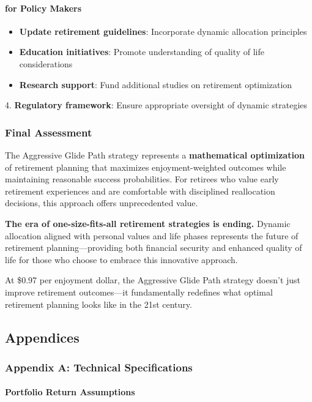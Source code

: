 \documentclass[11pt,letterpaper]{article}
\begin{document}
\paragraph{for Policy Makers}
\begin{itemize}
\item \textbf{Update retirement guidelines}: Incorporate dynamic allocation principles
\item \textbf{Education initiatives}: Promote understanding of quality of life considerations
\item \textbf{Research support}: Fund additional studies on retirement optimization
\end{itemize}
4. \textbf{Regulatory framework}: Ensure appropriate oversight of dynamic strategies


\subsubsection{Final Assessment}

The Aggressive Glide Path strategy represents a \textbf{mathematical optimization} of retirement planning that maximizes enjoyment-weighted outcomes while maintaining reasonable success probabilities. For retirees who value early retirement experiences and are comfortable with disciplined reallocation decisions, this approach offers unprecedented value.


\textbf{The era of one-size-fits-all retirement strategies is ending.} Dynamic allocation aligned with personal values and life phases represents the future of retirement planning—providing both financial security and enhanced quality of life for those who choose to embrace this innovative approach.


At \$0.97 per enjoyment dollar, the Aggressive Glide Path strategy doesn't just improve retirement outcomes—it fundamentally redefines what optimal retirement planning looks like in the 21st century.




\subsection{Appendices}

\subsubsection{Appendix A: Technical Specifications}

\paragraph{Portfolio Return Assumptions}
\end{document}
